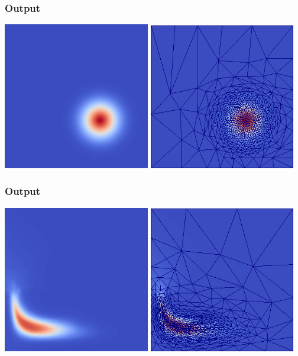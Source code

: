 \documentclass[12pt]{beamer}
\begin{document}
\begin{frame}
    \frametitle{Output}
\includegraphics[width=0.48\textwidth]{images/stommel_0.png}
\hspace{1mm}
\includegraphics[width=0.48\textwidth]{images/stommel_0_mesh.png}
\end{frame}
\begin{frame}
    \frametitle{Output}
\includegraphics[width=0.48\textwidth]{images/stommel_7.png}
\hspace{1mm}
\includegraphics[width=0.48\textwidth]{images/stommel_7_mesh.png}
\end{frame}
\end{document}
